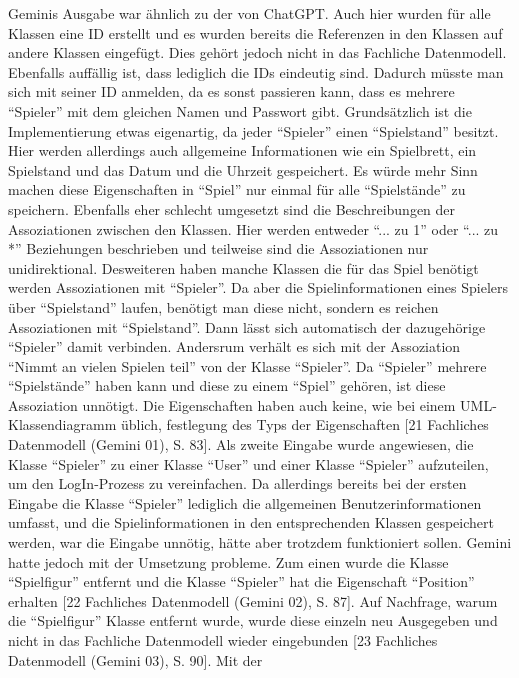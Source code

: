 Geminis Ausgabe war ähnlich zu der von ChatGPT. Auch hier wurden für alle Klassen eine ID erstellt und es wurden bereits die Referenzen in den Klassen auf andere Klassen
eingefügt. Dies gehört jedoch nicht in das Fachliche Datenmodell. Ebenfalls auffällig ist, dass lediglich die IDs eindeutig sind. Dadurch müsste man sich mit seiner ID
anmelden, da es sonst passieren kann, dass es mehrere ``Spieler'' mit dem gleichen Namen und Passwort gibt. Grundsätzlich ist die Implementierung etwas eigenartig, da jeder 
``Spieler'' einen ``Spielstand'' besitzt. Hier werden allerdings auch allgemeine Informationen wie ein Spielbrett, ein Spielstand und das Datum und die Uhrzeit gespeichert. 
Es würde mehr Sinn machen diese Eigenschaften in ``Spiel'' nur einmal für alle ``Spielstände'' zu speichern. Ebenfalls eher schlecht umgesetzt sind die Beschreibungen 
der Assoziationen zwischen den Klassen. Hier werden entweder ``... zu 1'' oder ``... zu *'' Beziehungen beschrieben und teilweise sind die Assoziationen nur 
unidirektional. Desweiteren haben manche Klassen die für das Spiel benötigt werden Assoziationen mit ``Spieler''. Da aber die Spielinformationen eines Spielers über 
``Spielstand'' laufen, benötigt man diese nicht, sondern es reichen Assoziationen mit ``Spielstand''. Dann lässt sich automatisch der dazugehörige ``Spieler'' 
damit verbinden. Andersrum verhält es sich mit der Assoziation ``Nimmt an vielen Spielen teil'' von der Klasse ``Spieler''. Da ``Spieler'' mehrere ``Spielstände'' haben 
kann und diese zu einem ``Spiel'' gehören, ist diese Assoziation unnötigt. Die Eigenschaften haben auch keine, wie bei einem UML-Klassendiagramm üblich, festlegung des 
Typs der Eigenschaften [21 Fachliches Datenmodell (Gemini 01), S. 83]. Als zweite Eingabe wurde angewiesen, die Klasse ``Spieler'' zu einer Klasse ``User'' und einer 
Klasse ``Spieler'' aufzuteilen, um den LogIn-Prozess zu vereinfachen. Da allerdings bereits bei der ersten Eingabe die Klasse ``Spieler'' lediglich die allgemeinen 
Benutzerinformationen umfasst, und die Spielinformationen in den entsprechenden Klassen gespeichert werden, war die Eingabe unnötig, hätte aber trotzdem funktioniert sollen.
Gemini hatte jedoch mit der Umsetzung probleme. Zum einen wurde die Klasse ``Spielfigur'' entfernt und die Klasse ``Spieler'' hat die Eigenschaft 
``Position'' erhalten [22 Fachliches Datenmodell (Gemini 02), S. 87]. Auf Nachfrage, warum die ``Spielfigur'' Klasse entfernt wurde, wurde diese 
einzeln neu Ausgegeben und nicht in das Fachliche Datenmodell wieder eingebunden [23 Fachliches Datenmodell (Gemini 03), S. 90]. Mit der 
